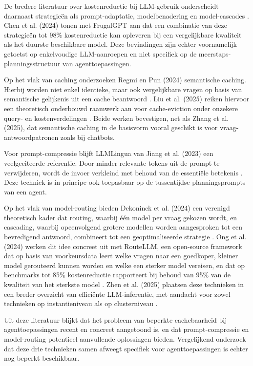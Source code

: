 \documentclass{hogent-article}
\begin{document}
De bredere literatuur over kostenreductie bij LLM-gebruik onderscheidt daarnaast strategieën als prompt-adaptatie, modelbenadering en model-cascades \autocite{Chen2024}. Chen et al. (2024) tonen met FrugalGPT aan dat een combinatie van deze strategieën tot 98\% kostenreductie kan opleveren bij een vergelijkbare kwaliteit als het duurste beschikbare model. Deze bevindingen zijn echter voornamelijk getoetst op enkelvoudige LLM-aanroepen en niet specifiek op de meerstaps-planningsstructuur van agenttoepassingen.

Op het vlak van caching onderzoeken Regmi en Pun (2024) semantische caching. Hierbij worden niet enkel identieke, maar ook vergelijkbare vragen op basis van semantische gelijkenis uit een cache beantwoord \autocite{Regmi2024}. Liu et al. (2025) reiken hiervoor een theoretisch onderbouwd raamwerk aan voor cache-eviction onder onzekere query- en kostenverdelingen \autocite{Liu2025}. Beide werken bevestigen, net als Zhang et al. (2025), dat semantische caching in de basisvorm vooral geschikt is voor vraag-antwoordpatronen zoals bij chatbots.

Voor prompt-compressie blijft LLMLingua van Jiang et al. (2023) een veelgeciteerde referentie. Door minder relevante tokens uit de prompt te verwijderen, wordt de invoer verkleind met behoud van de essentiële betekenis \autocite{Jiang2023}. Deze techniek is in principe ook toepasbaar op de tussentijdse planningsprompts van een agent.

Op het vlak van model-routing bieden Dekoninck et al. (2024) een verenigd theoretisch kader dat routing, waarbij één model per vraag gekozen wordt, en cascading, waarbij opeenvolgend grotere modellen worden aangesproken tot een bevredigend antwoord, combineert tot een geoptimaliseerde strategie \autocite{Dekoninck2024}. Ong et al. (2024) werken dit idee concreet uit met RouteLLM, een open-source framework dat op basis van voorkeursdata leert welke vragen naar een goedkoper, kleiner model gerouteerd kunnen worden en welke een sterker model vereisen, en dat op benchmarks tot 85\% kostenreductie rapporteert bij behoud van 95\% van de kwaliteit van het sterkste model \autocite{Ong2024}. Zhen et al. (2025) plaatsen deze technieken in een breder overzicht van efficiënte LLM-inferentie, met aandacht voor zowel technieken op instantieniveau als op clusterniveau \autocite{Zhen2025}.

Uit deze literatuur blijkt dat het probleem van beperkte cachebaarheid bij agenttoepassingen recent en concreet aangetoond is, en dat prompt-compressie en model-routing potentieel aanvullende oplossingen bieden. Vergelijkend onderzoek dat deze drie technieken samen afweegt specifiek voor agenttoepassingen is echter nog beperkt beschikbaar.
\end{document}
